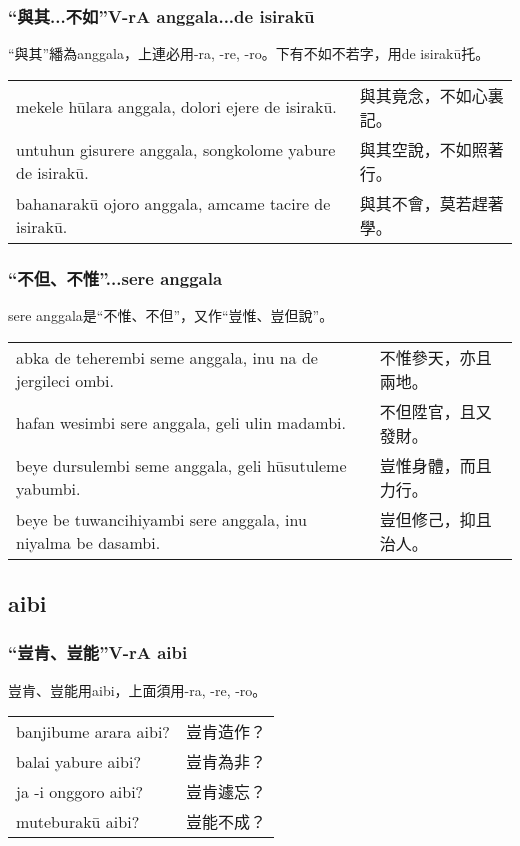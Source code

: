 \documentclass{article}
\begin{document}
\subsubsection{“與其...不如”V-rA anggala...de isirak\={u}}
\noindent “與其”繙為anggala，上連必用-ra, -re, -ro。下有不如不若字，用de isirak\={u}托。
\begin{center}
    \begin{tabularx}{\textwidth}{XX}
     mekele h\={u}lara anggala, dolori ejere de isirak\={u}.&與其竟念，不如心裏記。\\
     untuhun gisurere anggala, songkolome yabure de isirak\={u}.&與其空說，不如照著行。\\
     bahanarak\={u} ojoro anggala, amcame tacire de isirak\={u}.&與其不會，莫若趕著學。
    \end{tabularx}
\end{center}

\subsubsection{“不但、不惟”...sere anggala}
\noindent sere anggala是“不惟、不但”，又作“豈惟、豈但說”。
\begin{center}
    \begin{tabularx}{\textwidth}{XX}
     abka de teherembi seme anggala, inu na de jergileci ombi.&不惟參天，亦且兩地。\\
     hafan wesimbi sere anggala, geli ulin madambi.&不但陞官，且又發財。\\
     beye dursulembi seme anggala, geli h\={u}sutuleme yabumbi.&豈惟身體，而且力行。\\
     beye be tuwancihiyambi sere anggala, inu niyalma be dasambi.&豈但修己，抑且治人。
    \end{tabularx}
\end{center}

\subsection{aibi}
\subsubsection{“豈肯、豈能”V-rA aibi}
\noindent 豈肯、豈能用aibi，上面須用-ra, -re, -ro。
\begin{center}
    \begin{tabularx}{\textwidth}{XX}
     banjibume arara aibi? &豈肯造作？\\
     balai yabure aibi? &豈肯為非？\\
     ja -i onggoro aibi? &豈肯遽忘？\\
     muteburak\={u} aibi? &豈能不成？
    \end{tabularx}
\end{center}
\end{document}
